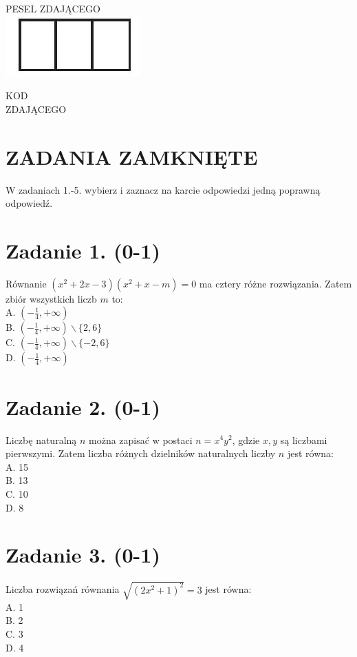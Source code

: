 \documentclass[10pt]{article}
\begin{document}
PESEL ZDAJĄCEGO\\
\includegraphics[max width=\textwidth, center]{2024_11_21_06df787f12c5337a1fe8g-01}

KOD\\
ZDAJĄCEGO

\section*{ZADANIA ZAMKNIĘTE}
W zadaniach 1.-5. wybierz i zaznacz na karcie odpowiedzi jedną poprawną odpowiedź.

\section*{Zadanie 1. (0-1)}
Równanie \(\left(x^{2}+2 x-3\right)\left(x^{2}+x-m\right)=0\) ma cztery różne rozwiązania. Zatem zbiór wszystkich liczb \(m\) to:\\
A. \(\left(-\frac{1}{4},+\infty\right)\)\\
B. \(\left(-\frac{1}{4},+\infty\right) \backslash\{2,6\}\)\\
C. \(\left(-\frac{1}{4},+\infty\right) \backslash\{-2,6\}\)\\
D. \(\left(-\frac{1}{4},+\infty\right)\)

\section*{Zadanie 2. (0-1)}
Liczbę naturalną \(n\) można zapisać w postaci \(n=x^{4} y^{2}\), gdzie \(x, y\) są liczbami pierwszymi. Zatem liczba różnych dzielników naturalnych liczby \(n\) jest równa:\\
A. 15\\
B. 13\\
C. 10\\
D. 8

\section*{Zadanie 3. (0-1)}
Liczba rozwiązań równania \(\sqrt{\left(2 x^{2}+1\right)^{2}}=3\) jest równa:\\
A. 1\\
B. 2\\
C. 3\\
D. 4
\end{document}

